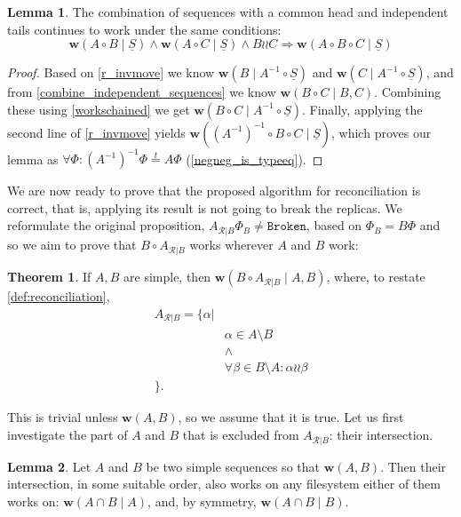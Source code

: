 \documentclass[12pt]{article}
\newcommand{\fsbroken}{\mathtt{Broken}} %
\newcommand{\FS}{\Phi} %
\newcommand{\cc}{\circ} %
\newcommand{\indep}{\mathrel{\wr\wr}} %
\newcommand{\workssign}{\mathbf{w}}
\newcommand{\works}[1]{\workssign({#1})}
\newcommand{\worksc}[2]{\workssign({#1}\mathrel{|}{#2})}
\newcommand{\typeeq}{\stackrel{t}{=}} %
\newcommand{\seqset}[1]{\underline{#1}} %
\newcommand{\recchar}[3]{{#1}^{#3}_{\mathcal{R}|{#2}}}
\newcommand{\reca}{\recchar{A}{B}{}} %
\theoremstyle{definition}
\newtheorem{mydef}{Definition}
\newtheorem{mylem}{Lemma}
\newtheorem{myth}{Theorem}
\begin{document}
\begin{mylem}\label{indep_prefix_combine}
The combination of sequences with a common head and independent tails 
continues to work under the same conditions:
\[ \worksc{A\cc B}{\seqset{S}} \wedge \worksc{A\cc C}{\seqset{S}} \wedge B\indep C \Rightarrow \worksc{A\cc B\cc C}{\seqset{S}} \]
\end{mylem}
\begin{proof}
Based on \cref{r_invmove} we know
$\worksc{B}{A^{-1}\cc \seqset{S}}$ and $\worksc{C}{A^{-1}\cc \seqset{S}}$,
and from \cref{combine_independent_sequences} we know
$\worksc{B\cc C}{B,C}$.
Combining these using \cref{workschained}
we get
$\worksc{B\cc C}{A^{-1}\cc \seqset{S}}$. 
Finally, applying the second line of \cref{r_invmove} yields
$\worksc{(A^{-1})^{-1}\cc B\cc C}{\seqset{S}}$, which proves our lemma 
as $\forall\FS: (A^{-1})^{-1}\FS\typeeq A\FS$ (\cref{negneg_is_typeeq}).
\end{proof}


\medskip


We are now ready to prove that the proposed algorithm for reconciliation is correct,
that is, applying its result is not going to break the replicas.
We reformulate the original proposition, $\reca\FS_B\neq\fsbroken$,
based on $\FS_B=B\FS$ and so we aim to prove that
$B\cc\reca$ works wherever $A$ and $B$ work:

\begin{myth}
If $A, B$ are simple, then $\worksc{B\cc \reca}{A,B}$,
where, to restate \cref{def:reconciliation},
\begin{align*}
\reca = \{\alpha| & \\
& \alpha\in A\setminus B \\
& \wedge \\
& \forall \beta\in B\setminus A: \alpha\indep\beta\\
\}. &
\end{align*}
\end{myth}

This is trivial unless $\works{A,B}$, so we assume that it is true.
Let us first investigate the part of $A$ and $B$ that is excluded from
$\reca$: their intersection.

\begin{mylem}\label{can_move_intersection}
Let $A$ and $B$ be two simple sequences so that $\works{A, B}$.
Then their intersection, in some suitable order, also works on any filesystem
either of them works on:
$\worksc{A\cap B}{A}$, and, by symmetry,
$\worksc{A\cap B}{B}$.
\end{mylem}
\end{document}
